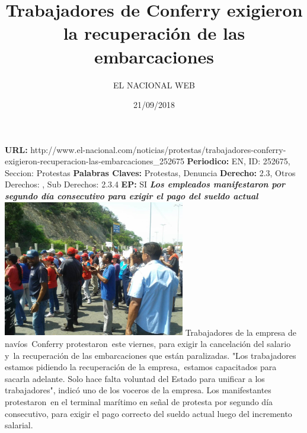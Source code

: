 \documentclass{article}%
\title{\textbf{Trabajadores de Conferry exigieron la recuperación de las embarcaciones}}%
\author{EL NACIONAL WEB}%
\date{21/09/2018}%
\begin{document}
%
\normalsize%
\maketitle%
\textbf{URL: }%
http://www.el{-}nacional.com/noticias/protestas/trabajadores{-}conferry{-}exigieron{-}recuperacion{-}las{-}embarcaciones\_252675\newline%
%
\textbf{Periodico: }%
EN, %
ID: %
252675, %
Seccion: %
Protestas\newline%
%
\textbf{Palabras Claves: }%
Protestas, Denuncia\newline%
%
\textbf{Derecho: }%
2.3, %
Otros Derechos: %
, %
Sub Derechos: %
2.3.4\newline%
%
\textbf{EP: }%
SI\newline%
\newline%
%
\textbf{\textit{Los empleados manifestaron por segundo día consecutivo para exigir el pago del sueldo actual}}%
\newline%
\newline%
%
\includegraphics[width=300px]{241.jpg}%
\newline%
%
Trabajadores de la empresa de navíos~Conferry protestaron~este viernes, para exigir la cancelación del salario y~la recuperación de las embarcaciones que están paralizadas.%
\newline%
%
"Los trabajadores estamos pidiendo la recuperación de la empresa,~estamos capacitados para sacarla adelante. Solo hace falta voluntad del Estado para unificar a los trabajadores", indicó uno de los voceros de la empresa.%
\newline%
%
Los manifestantes protestaron~en el terminal marítimo en señal de protesta por segundo día consecutivo, para exigir el pago correcto del sueldo actual luego del incremento salarial.%
\newline%
%
\end{document}
